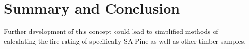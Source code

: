 \chapter{Summary and Conclusion}
Further development of this concept could lead to simplified methods of calculating the fire rating of specifically SA-Pine as well as other timber samples.